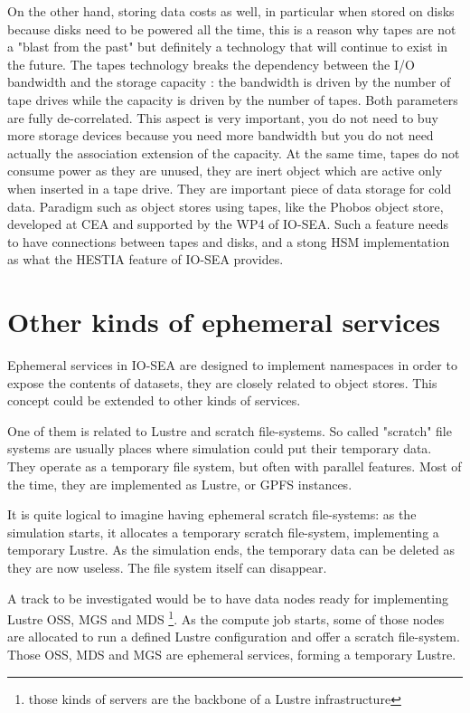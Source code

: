 On the other hand, storing data costs as well, in particular when stored on disks because disks need to be
powered all the time, this is a reason why tapes are not a "blast from the past" but definitely a technology
that will continue to exist in the future. The tapes technology breaks the dependency between the I/O bandwidth
and the storage capacity : the bandwidth is driven by the number of tape drives while the capacity is driven
by the number of tapes. Both parameters are fully de-correlated. This aspect is very important, you do not 
need to buy more storage devices because you need more bandwidth but you do not need actually the association
extension of the capacity. At the same time, tapes do not consume power as they are unused, they are inert 
object which are active only when inserted in a tape drive. They are important piece of data storage for 
cold data. Paradigm such as object stores using tapes, like the Phobos object store, developed at CEA and 
supported by the WP4 of IO-SEA. Such a feature needs to have connections between tapes and disks, and a stong
HSM implementation as what the HESTIA feature of IO-SEA provides. 

\section{Other kinds of ephemeral services}

Ephemeral services in IO-SEA are designed to implement namespaces in order to expose the contents of datasets, 
they are closely related to object stores. This concept could be extended to other kinds of services.

One of them is related to Lustre and scratch file-systems. So called "scratch" file systems are usually places 
where simulation could put their temporary data. They operate as a temporary file system, but often with parallel
features. Most of the time, they are implemented as Lustre, or GPFS instances. 

It is quite logical to imagine having ephemeral scratch file-systems: as the simulation starts, it allocates a
temporary scratch file-system, implementing a temporary Lustre. As the simulation ends, the temporary data can
be deleted as they are now useless. The file system itself can disappear. 

A track to be investigated would be to have data nodes ready for implementing Lustre OSS, MGS and MDS
\footnote{those kinds of servers are the backbone of a Lustre infrastructure}. As the compute job starts, some
of those nodes are allocated to run a defined Lustre configuration and offer a scratch file-system. Those
OSS, MDS and MGS are ephemeral services, forming a temporary Lustre. 

